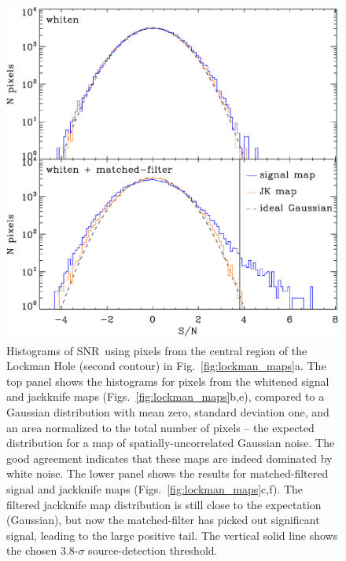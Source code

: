 \documentclass[useAMS,usenatbib,nofootinbib]{mn2e}
\newcommand{\snr}{SNR}
\begin{document}
\begin{figure}
\centering
\includegraphics[width=\linewidth]{lockman_hist.pdf}
\caption{Histograms of \snr\ using pixels from the central region of
  the Lockman Hole (second contour) in
  Fig.~\ref{fig:lockman_maps}a. The top panel shows the histograms for
  pixels from the whitened signal and jackknife maps
  (Figs.~\ref{fig:lockman_maps}b,e), compared to a Gaussian
  distribution with mean zero, standard deviation one, and an area
  normalized to the total number of pixels -- the expected
  distribution for a map of spatially-uncorrelated Gaussian noise. The
  good agreement indicates that these maps are indeed dominated by
  white noise. The lower panel shows the results for matched-filtered
  signal and jackknife maps (Figs.~\ref{fig:lockman_maps}c,f). The
  filtered jackknife map distribution is still close to the
  expectation (Gaussian), but now the matched-filter has picked out
  significant signal, leading to the large positive tail. The vertical
  solid line shows the chosen 3.8-$\sigma$ source-detection
  threshold.}
\label{fig:lockman_hist}
\end{figure}
\end{document}
